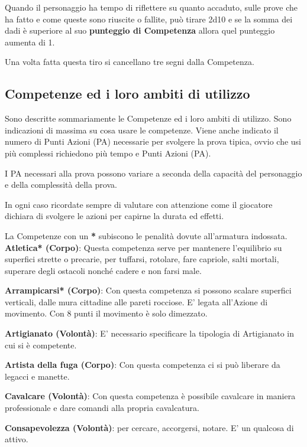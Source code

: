 \documentclass[12pt,a4paper,twoside,openany]{book}
\begin{document}
\begin{multicols}{2}
Quando il personaggio ha tempo di riflettere su quanto accaduto, sulle prove che ha fatto e come queste sono riuscite o fallite, può tirare 2d10 e se la somma dei dadi è superiore al suo \textbf{punteggio di Competenza} allora quel punteggio aumenta di 1.

Una volta fatta questa tiro si cancellano tre segni dalla Competenza.	

\subsection{Competenze ed i loro ambiti di utilizzo}\label{competenzeambitidiutilizzo}

Sono descritte sommariamente le Competenze ed i loro ambiti di utilizzo. Sono indicazioni di massima su cosa usare le competenze. Viene anche indicato il numero di Punti Azioni (PA) necessarie per svolgere la prova tipica, ovvio che usi più complessi richiedono più tempo e Punti Azioni (PA).

I PA necessari alla prova possono variare a seconda della capacità del personaggio e della complessità della prova.

In ogni caso ricordate sempre di valutare con attenzione come il giocatore dichiara di svolgere le azioni per capirne la durata ed effetti. 

La Competenze con un \textbf{*} subiscono le penalità dovute all'armatura indossata.\\

\textbf{Atletica* (Corpo)}: Questa competenza serve per mantenere l'equilibrio su superfici strette o precarie, per tuffarsi, rotolare, fare capriole, salti mortali, superare degli ostacoli nonché cadere e non farsi male. 

\textbf{Arrampicarsi* (Corpo)}: Con questa competenza si possono scalare superfici verticali, dalle mura cittadine alle pareti rocciose. E' legata all'Azione di movimento. Con 8 punti il movimento è solo dimezzato.

\textbf{Artigianato (Volontà)}: E' necessario specificare la tipologia di Artigianato in cui si è competente.

\textbf{Artista della fuga (Corpo)}: Con questa competenza ci si può liberare da legacci e manette.

\textbf{Cavalcare (Volontà)}: Con questa competenza è possibile cavalcare in maniera professionale e dare comandi alla propria cavalcatura. 

\textbf{Consapevolezza (Volontà)}: per cercare, accorgersi, notare. E' un qualcosa di attivo.


\end{multicols}
\end{document}
